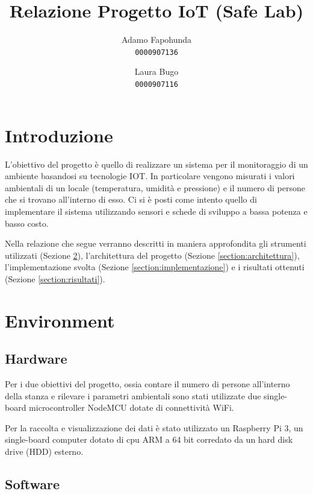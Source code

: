 \documentclass{article}
\title{Relazione Progetto IoT 
(Safe Lab)}
\author{
  Adamo Fapohunda\\
  \texttt{0000907136}
  \and
  Laura Bugo\\
  \texttt{0000907116}
}
\date{ }
\begin{document}
\maketitle

\section{Introduzione}


L'obiettivo del progetto è quello di realizzare un sistema per il monitoraggio di un ambiente basandosi su tecnologie IOT. In particolare vengono misurati i valori ambientali di un locale (temperatura, umidità e pressione) e il numero di persone che si trovano all'interno di esso. Ci si è posti come intento quello di implementare il sistema utilizzando sensori e schede di sviluppo a bassa potenza e basso costo.

Nella relazione che segue verranno descritti in maniera approfondita gli strumenti utilizzati (Sezione \ref{section:environment}), l'architettura del progetto (Sezione \ref{section:architettura}), l'implementazione svolta (Sezione \ref{section:implementazione}) e i risultati ottenuti (Sezione \ref{section:risultati}).


\section{Environment}
\label{section:environment}

\subsection{Hardware}

Per i due obiettivi del progetto, ossia contare il numero di persone all'interno della stanza e rilevare i parametri ambientali sono stati utilizzate due single-board microcontroller NodeMCU dotate di connettività WiFi.

Per la raccolta e visualizzazione dei dati è stato utilizzato un Raspberry Pi 3, un single-board computer dotato di cpu ARM a 64 bit corredato da un hard disk drive (HDD) esterno.

\subsection{Software}
\end{document}
